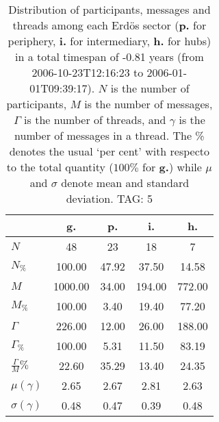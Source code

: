 \begin{table}[h!]
\begin{center}
\begin{tabular}{| l | c | c | c | c |}\hline
 & g. & p. & i. & h. \\\hline
$N$ & 48  & 23  & 18  & 7 \\\hline
$N_{\%}$ & 100.00  & 47.92  & 37.50  & 14.58 \\\hline
$M$ & 1000.00  & 34.00  & 194.00  & 772.00 \\\hline
$M_{\%}$ & 100.00  & 3.40  & 19.40  & 77.20 \\\hline
$\Gamma$ & 226.00  & 12.00  & 26.00  & 188.00 \\\hline
$\Gamma_{\%}$ & 100.00  & 5.31  & 11.50  & 83.19 \\\hline
$\frac{\Gamma}{M}\%$ & 22.60  & 35.29  & 13.40  & 24.35 \\\hline
$\mu(\gamma)$ & 2.65  & 2.67  & 2.81  & 2.63 \\\hline
$\sigma(\gamma)$ & 0.48  & 0.47  & 0.39  & 0.48 \\\hline
\end{tabular}
\caption{Distribution of participants, messages and threads among each Erd\"os sector ({\bf p.} for periphery, {\bf i.} for intermediary, 
    {\bf h.} for hubs) in a total timespan of -0.81 years (from 2006-10-23T12:16:23 to 2006-01-01T09:39:17). $N$ is the number of participants, $M$ is the number of messages, $\Gamma$ is the number of threads, and $\gamma$ is the number of messages in a thread.
    The \% denotes the usual `per cent' with respecto to the total quantity ($100\%$ for {\bf g.})
    while $\mu$ and $\sigma$ denote mean and standard deviation. TAG: 5}
\end{center}
\end{table}